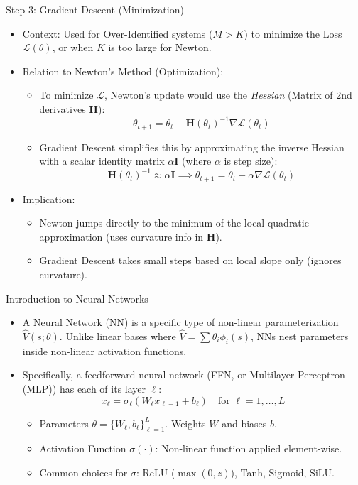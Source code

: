 \documentclass[aspectratio=169]{beamer}
\newcommand{\1}{\mathbf{1}}
\begin{document}
\begin{frame}{Step 3: Gradient Descent (Minimization)}
\small
    \begin{itemize}
    \item Context: Used for Over-Identified systems ($M > K$) to minimize the Loss $\mathcal{L}(\theta)$, or when $K$ is too large for Newton.
    
    \item Relation to Newton's Method (Optimization):
    \begin{itemize}
        \item To minimize $\mathcal{L}$, Newton's update would use the \textit{Hessian} (Matrix of 2nd derivatives $\mathbf{H}$):
        $$ \theta_{t+1} = \theta_t - \mathbf{H}(\theta_t)^{-1} \nabla \mathcal{L}(\theta_t) $$
        \item Gradient Descent simplifies this by approximating the inverse Hessian with a scalar identity matrix $\alpha \mathbf{I}$ (where $\alpha$ is step size):
        $$ \mathbf{H}(\theta_t)^{-1} \approx \alpha \mathbf{I} \implies \theta_{t+1} = \theta_t - \alpha \nabla \mathcal{L}(\theta_t) $$
    \end{itemize}
    
    \item Implication:
    \begin{itemize}
        \item Newton jumps directly to the minimum of the local quadratic approximation (uses curvature info in $\mathbf{H}$).
        \item Gradient Descent takes small steps based on local slope only (ignores curvature).
    \end{itemize}
    \end{itemize}
\end{frame}




\begin{frame}{Introduction to Neural Networks}
\begin{itemize}
    \item A Neural Network (NN) is a specific type of non-linear parameterization $\hat{V}(s; \theta)$. Unlike linear bases where $\hat{V} = \sum \theta_i \phi_i(s)$, NNs nest parameters inside non-linear activation functions.
    \item Specifically, a feedforward neural network (FFN, or Multilayer Perceptron (MLP)) has each of its layer $\ell$:
    $$ x_\ell = \sigma_\ell (W_\ell x_{\ell-1} + b_\ell) \quad \text{for } \ell = 1, \dots, L $$
    \begin{itemize}
        \item Parameters $\theta = \{W_\ell, b_\ell\}_{\ell=1}^L$. Weights $W$ and biases $b$.
        \item Activation Function $\sigma(\cdot)$: Non-linear function applied element-wise.
        \item Common choices for $\sigma$: ReLU ($\max(0,z)$), Tanh, Sigmoid, SiLU.
    \end{itemize}
\end{itemize}
\end{frame}
\end{document}

